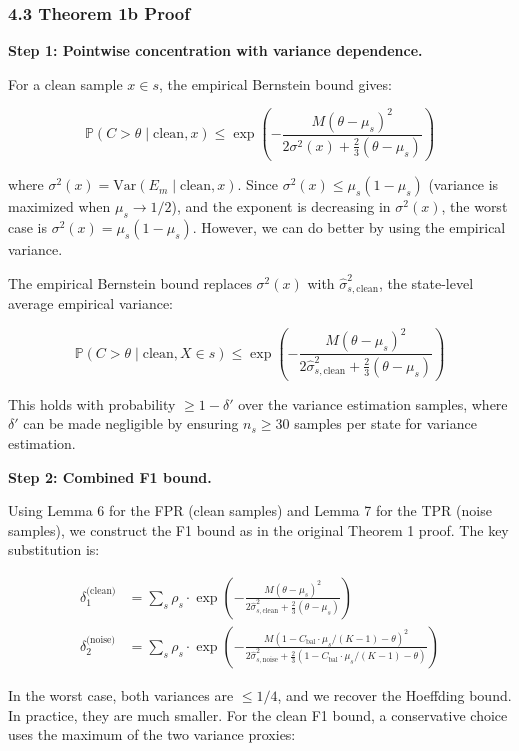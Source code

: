 \documentclass[
  12pt,
]{ctexart}
\begin{document}
\subsubsection{4.3 Theorem 1b Proof}\label{theorem-1b-proof}

\textbf{Step 1: Pointwise concentration with variance dependence.}

For a clean sample \(x \in s\), the empirical Bernstein bound gives:

\[\mathbb{P}(C > \theta \mid \text{clean}, x) \leq \exp\!\left(-\frac{M(\theta - \mu_s)^2}{2\sigma^2(x) + \frac{2}{3}(\theta - \mu_s)}\right)\]

where \(\sigma^2(x) = \text{Var}(E_m \mid \text{clean}, x)\). Since
\(\sigma^2(x) \leq \mu_s(1-\mu_s)\) (variance is maximized when
\(\mu_s \to 1/2\)), and the exponent is decreasing in \(\sigma^2(x)\),
the worst case is \(\sigma^2(x) = \mu_s(1-\mu_s)\). However, we can do
better by using the empirical variance.

The empirical Bernstein bound replaces \(\sigma^2(x)\) with
\(\hat{\sigma}_{s,\text{clean}}^2\), the state-level average empirical
variance:

\[\mathbb{P}(C > \theta \mid \text{clean}, X \in s) \leq \exp\!\left(-\frac{M(\theta - \mu_s)^2}{2\hat{\sigma}_{s,\text{clean}}^2 + \frac{2}{3}(\theta - \mu_s)}\right)\]

This holds with probability \(\geq 1 - \delta'\) over the variance
estimation samples, where \(\delta'\) can be made negligible by ensuring
\(n_s \geq 30\) samples per state for variance estimation.

\textbf{Step 2: Combined F1 bound.}

Using Lemma 6 for the FPR (clean samples) and Lemma 7 for the TPR (noise
samples), we construct the F1 bound as in the original Theorem 1 proof.
The key substitution is:

\[\begin{aligned}
\delta_1^{\text{(clean)}} &= \sum_s \rho_s \cdot \exp\!\left(-\frac{M(\theta - \mu_s)^2}{2\hat{\sigma}_{s,\text{clean}}^2 + \frac{2}{3}(\theta - \mu_s)}\right) \\
\delta_2^{\text{(noise)}} &= \sum_s \rho_s \cdot \exp\!\left(-\frac{M(1 - C_{\text{bal}}\cdot\mu_s/(K-1) - \theta)^2}{2\hat{\sigma}_{s,\text{noise}}^2 + \frac{2}{3}(1 - C_{\text{bal}}\cdot\mu_s/(K-1) - \theta)}\right)
\end{aligned}\]

In the worst case, both variances are \(\leq 1/4\), and we recover the
Hoeffding bound. In practice, they are much smaller. For the clean F1
bound, a conservative choice uses the maximum of the two variance
proxies:
\end{document}

